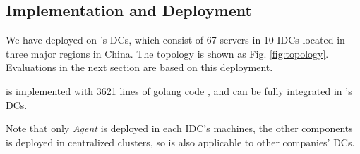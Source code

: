 \subsection{Implementation and Deployment}
\label{sec:deployment}

We have deployed \name on \company's DCs, which consist of 67 servers in 10 IDCs located in three major regions in China. The topology is shown as Fig. \ref{fig:topology}. Evaluations in the next section are based on this deployment.

\name is implemented with 3621 lines of golang code \cite{golang}, and can be fully integrated in \company's DCs.

%

Note that only \emph{Agent} is deployed in each IDC's machines, the other components is deployed in centralized clusters, so \name is also applicable to other companies' DCs. 	


